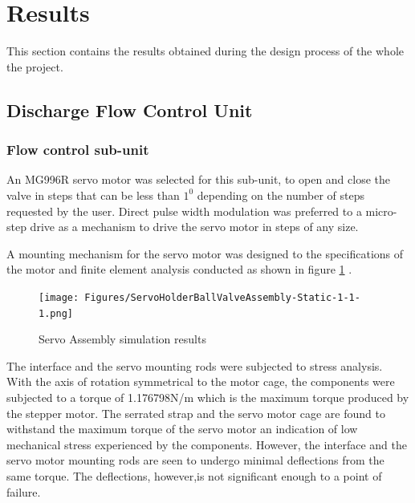 \section{Results}
This section contains the results obtained during the design process of the whole the project.
\subsection{Discharge Flow Control Unit}
\subsubsection{Flow control sub-unit}
An MG996R servo motor was selected for this sub-unit, to open and close the valve in steps that can be less than $1^{0}$ depending on the number of steps requested by the user. Direct pulse width modulation was preferred to a micro-step drive as a mechanism to drive the servo motor in steps of any size.
\par
A mounting mechanism for the servo motor was designed to the specifications of the motor and finite element analysis conducted as shown in figure \ref{fig:servo_assembly_results} .   
\begin{figure}[H]
      \centering
         \texttt{[image: Figures/ServoHolderBallValveAssembly-Static-1-1-1.png]}
          \caption{Servo Assembly simulation results}
          \label{fig:servo_assembly_results}
      \end{figure}
    The interface and the servo mounting rods were subjected to stress analysis. With the axis of rotation symmetrical to the motor cage, the components were subjected to a torque of 1.176798N/m which is the maximum torque produced by the stepper motor. The serrated strap and the servo motor cage are found to withstand the maximum torque of the servo motor an indication of low mechanical stress experienced by the components. However, the interface and the servo motor mounting rods are seen to undergo minimal deflections from the same torque. The deflections, however,is not significant enough to a point of failure. 
